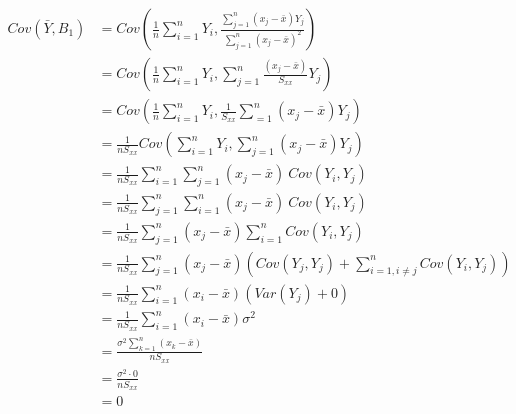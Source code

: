 \documentclass{article}
\begin{document}
\begin{align*}
    Cov(\bar{Y}, B_1) & = Cov\left( \frac{1}{n} \sum_{i=1}^n Y_i, \frac{\sum_{j=1}^n (x_j - \bar{x}) Y_j}{\sum_{j=1}^n (x_j - \bar{x})^2} \right) \\
                      & = Cov\left( \frac{1}{n} \sum_{i=1}^n Y_i, \sum_{j=1}^n \frac{(x_j - \bar{x})}{S_{xx}} Y_j \right)                         \\
                      & = Cov\left( \frac{1}{n} \sum_{i=1}^n Y_i, \frac{1}{S_{xx}} \sum_{=1}^n (x_j - \bar{x}) Y_j \right)                        \\
                      & = \frac{1}{n S_{xx}} Cov\left( \sum_{i=1}^n Y_i, \sum_{j=1}^n (x_j - \bar{x}) Y_j \right)                                 \\
                      & = \frac{1}{n S_{xx}} \sum_{i=1}^n \sum_{j=1}^n (x_j - \bar{x}) \:Cov(Y_i, Y_j)                                            \\
                      & = \frac{1}{n S_{xx}} \sum_{j=1}^n \sum_{i=1}^n (x_j - \bar{x}) \:Cov(Y_i, Y_j)                                            \\
                      & = \frac{1}{n S_{xx}} \sum_{j=1}^n (x_j - \bar{x}) \sum_{i=1}^n Cov(Y_i, Y_j)                                              \\
                      & = \frac{1}{n S_{xx}} \sum_{j=1}^n (x_j - \bar{x}) \left( Cov(Y_j, Y_j) + \sum_{i=1, i\neq j}^n Cov(Y_i, Y_j) \right)      \\
                      & = \frac{1}{n S_{xx}} \sum_{i=1}^n (x_i - \bar{x}) (Var(Y_j) + 0)                                                          \\
                      & = \frac{1}{n S_{xx}} \sum_{i=1}^n (x_i - \bar{x}) \sigma^2                                                                \\
                      & = \frac{\sigma^2 \sum_{k=1}^n (x_k - \bar{x})}{n S_{xx}}                                                                  \\
                      & = \frac{\sigma^2 \cdot 0}{n S_{xx}}                                                                                       \\
                      & = 0
\end{align*}
\end{document}
